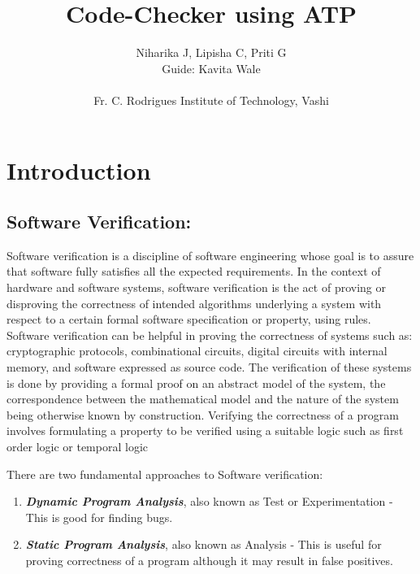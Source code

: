 \documentclass[]{article}
\begin{document}
 
	\title{\huge\textbf{Code-Checker using ATP}}
	\author{Niharika J, Lipisha C, Priti G  \\Guide: Kavita Wale \\ \\ \LARGE Fr. C. Rodrigues Institute of Technology, Vashi}
	\maketitle
	\pagebreak


\section{Introduction}\label{introduction}

\subsection{Software Verification:}\label{software-verification}

Software verification is a discipline of software engineering whose goal
is to assure that software fully satisfies all the expected
requirements. In the context of hardware and software systems, software
verification is the act of proving or disproving the correctness of
intended algorithms underlying a system with respect to a certain formal
software specification or property, using rules. Software verification
can be helpful in proving the correctness of systems such as:
cryptographic protocols, combinational circuits, digital circuits with
internal memory, and software expressed as source code. The verification
of these systems is done by providing a formal proof on an abstract
model of the system, the correspondence between the mathematical model
and the nature of the system being otherwise known by construction.
Verifying the correctness of a program involves formulating a property
to be verified using a suitable logic such as first order logic or
temporal logic

There are two fundamental approaches to Software verification:

\begin{enumerate}
\def\labelenumi{\arabic{enumi}.}
\item
  \emph{\textbf{Dynamic Program Analysis}}, also known as Test or
  Experimentation - This is good for finding bugs.
\item
  \emph{\textbf{Static Program Analysis}}, also known as Analysis - This
  is useful for proving correctness of a program although it may result
  in false positives.
\end{enumerate}
\end{document}
